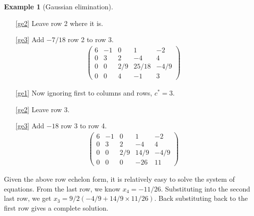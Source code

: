 \documentclass[12pt,reqno]{amsart}
\theoremstyle{definition}
\newtheorem{example}{Example}[section]
\begin{document}
\begin{example}[Gaussian elimination]
\begin{itemize}
  \item[\ref{ge2}] Leave row 2 where it is.
  \item[\ref{ge3}] Add $-7/18$ row 2 to row 3.
    \begin{align*}
      \begin{pmatrix} 
        6 & -1 &  0 & 1  & -2 \\
        0 &  3 &  2 & -4 & 4 \\
        0 & 0  &  2/9 & 25/18 & -4/9 \\
        0 & 0  & 4 & -1  & 3 
      \end{pmatrix}
    \end{align*}  
  \item[\ref{ge1}] Now ignoring first to columns and rows, $c^* = 3$.
  \item[\ref{ge2}] Leave row 3.
  \item[\ref{ge3}] Add $-18$ row 3 to row 4.
    \begin{align*}
      \begin{pmatrix} 
        6 & -1 &  0 & 1  & -2 \\
        0 &  3 &  2 & -4 & 4 \\
        0 & 0  &  2/9 & 14/9 & -4/9 \\
        0 & 0  & 0 & -26  & 11
      \end{pmatrix}
    \end{align*}  
  \end{itemize}
  Given the above row echelon form, it is relatively easy to solve the
  system of equations. From the last row, we know $x_4 =
  -11/26$. Substituting into the second last row, we get $x_3 = 9/2
  (-4/9 + 14/9\times 11/26)$. Back substituting back to the first row
  gives a complete solution.
\end{example}
\end{document}
